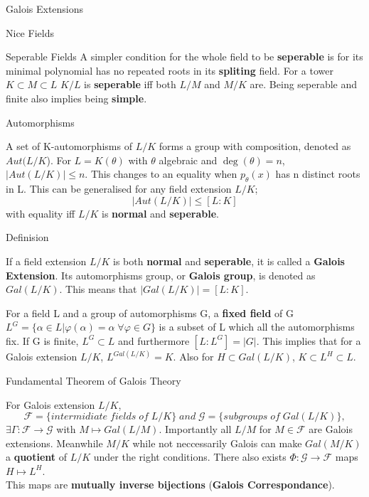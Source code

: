 \documentclass[12pt, letterpaper]{article}
\begin{document}
\begin{section}{Galois Extensions}
\begin{subsection}{Nice Fields}
\begin{subsubsection}{Seperable Fields}
      A simpler condition for the whole field to be \textbf{seperable} is for
      its minimal polynomial has no repeated roots in its \textbf{spliting}
      field. For a tower \(K \subset M \subset L\) \(K / L\) is \textbf{seperable}
      iff both \(L / M\) and \(M / K\) are. Being seperable and finite also
      implies being \textbf{simple}. \\

      \end{subsubsection}

  \end{subsection}

  \begin{subsection}{Automorphisms}

    A set of K-automorphisms of \(L / K\) forms a group with composition,
    denoted as \(Aut(L / K\)). For \(L = K(\theta)\) with \(\theta\) algebraic
    and \(\deg(\theta) = n\), \(|Aut(L / K)| \leq n\). This changes to an
    equality when \(p_{\theta}(x)\) has n distinct roots in L. This can be
    generalised for any field extension \(L / K\); \[|Aut(L / K)| \leq [L : K]\]
    with equality iff \(L / K\) is \textbf{normal} and \textbf{seperable}.

  \end{subsection}

  \begin{subsection}{Definision}

    If a field extension \(L / K\) is both \textbf{normal} and
    \textbf{seperable}, it is called a \textbf{Galois Extension}. Its
    automorphisms group, or \textbf{Galois group}, is denoted as \(Gal(L / K)\).
    This means that \(|Gal(L / K)| = [L : K]\).

    For a field L and a group of automorphisms G, a \textbf{fixed field} of G
    \(L^{G} = \{ \alpha \in L | \varphi(\alpha) = \alpha \; \forall \varphi \in
    G\}\) is a subset of L which all the automorphisms fix. If G is finite,
    \(L^{G} \subset L\) and furthermore \([L : L^{G}] = |G|\). This implies
    that for a Galois extension \(L / K\), \(L^{Gal(L / K)} = K\). Also for \(H
    \subset Gal(L / K)\), \(K \subset L^{H} \subset L\).

    \begin{subsubsection}{Fundamental Theorem of Galois Theory}

      For Galois extension \(L / K\), \[\mathcal{F} = \{ intermidiate \; fields
        \; of \; L / K \} \; and \; \mathcal{G} = \{ subgroups \; of \; Gal(L / K)
      \},\] \(\exists \Gamma : \mathcal{F} \to \mathcal{G}\) with \(M \mapsto
      Gal(L / M)\). Importantly all \(L / M\) for \(M \in \mathcal{F}\) are
      Galois extensions. Meanwhile \(M / K\) while not neccessarily Galois can
      make \(Gal(M / K)\) a \textbf{quotient} of \(L / K\) under the right
      conditions. There also exists \(\Phi: \mathcal{G} \to \mathcal{F}\)
      maps \(H \mapsto L^{H}\). \\
      This maps are \textbf{mutually inverse bijections} (\textbf{Galois
        Correspondance}).


\end{subsubsection}
\end{subsection}
\end{section}
\end{document}
